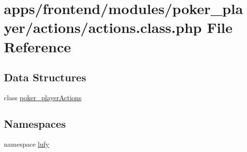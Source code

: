 \hypertarget{frontend_2modules_2poker__player_2actions_2actions_8class_8php}{\section{apps/frontend/modules/poker\-\_\-player/actions/actions.class.\-php File Reference}
\label{frontend_2modules_2poker__player_2actions_2actions_8class_8php}
}
\subsection*{Data Structures}
\begin{DoxyCompactItemize}
\item 
class \hyperlink{classpoker__player_actions}{poker\-\_\-player\-Actions}
\end{DoxyCompactItemize}
\subsection*{Namespaces}
\begin{DoxyCompactItemize}
\item 
namespace \hyperlink{namespacelufy}{lufy}
\end{DoxyCompactItemize}
